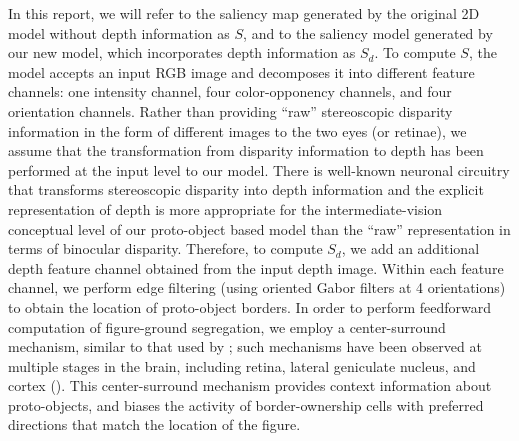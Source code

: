 In this report, we will refer to the saliency map generated by the
original 2D model without depth information as $S$, and to the saliency model generated by our new model, which incorporates depth
information as $S_d$. To compute $S$, the model accepts an input RGB
image and decomposes it into different feature channels: one intensity
channel, four color-opponency channels, and four orientation channels.
Rather than providing ``raw'' stereoscopic disparity information in the form of different images to the two eyes (or retinae), we assume
that the transformation from disparity information to depth has been
performed at the input level to our model. There is well-known neuronal circuitry that transforms stereoscopic disparity into depth
information \cite[\eg][]{Poggio_Poggio84} and the explicit representation of depth is more appropriate for the intermediate-vision conceptual level of our proto-object based model
than the ``raw'' representation in terms of binocular disparity. Therefore, to compute $S_d$, we add an additional depth feature channel obtained from the input depth image. Within each feature channel, we perform edge filtering (using oriented Gabor filters at 4 orientations) to obtain the location of proto-object borders. In order
to perform feedforward computation of figure-ground segregation, we
employ a center-surround mechanism, similar to that used by \cite{Itti_etal98a}; such mechanisms have been observed at multiple
stages in the brain, including retina, lateral geniculate nucleus, and
cortex (\ibid). This center-surround mechanism provides context information about proto-objects, and biases the activity of border-ownership cells with preferred directions that match the location of the figure.

